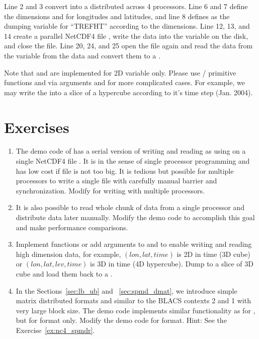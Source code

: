 Line 2 and 3 convert  into a  distributed
across 4 processors. Line 6 and 7 define the dimensions
 and  for longitudes and latitudes, and line 8
defines  as the dumping variable for ``TREFHT'' according
to the dimensions.
 Line 12, 13, and 14 create a parallel NetCDF4 file
,
write the data into the variable on the disk, and close the file.
Line 20, 24, and 25 open the file again and read the data from the
variable from the data and convert them to a .

Note that  and  are implemented
for 2D variable only. Please use / primitive functions
 and  via arguments 
and  for more complicated cases. For example, we may write
the  into a slice of a hypercube according to it's time step
(Jan. 2004).


\section{Exercises}
\label{sec:pbdNCDF4_exercise}

\begin{enumerate}[label=\thechapter-\arabic*]
\item
The demo code  of  has a serial version
of writing and reading  as using  on a single
NetCDF4 file . It is in the sense of single processor
programming and has low cost if file is not too big.
It is tedious but possible for multiple processors to write
a single file with carefully manual barrier and synchronization.
Modify  for writing with multiple processors.

\item
It is also possible to read whole chunk of data from a single processor
and distribute data later manually. Modify the demo code
 to accomplish this goal and make performance
comparisons.

\item
Implement functions or add arguments to  and
 to enable writing and reading high dimension data,
for example, $(lon, lat, time)$ is 2D in time (3D cube) or
$(lon, lat, lev, time)$ is 3D in time (4D hypercube).
Dump  to a slice of 3D cube and load them back to a
.

\item
In the Sections~\ref{sec:lb_ub} and ~\ref{sec:spmd_dmat}, we introduce
simple matrix distributed formats  and  similar to
the BLACS contexts  2 and 1 with very large block size.
The demo code
 implements similar functionality as for
, but for  format only. Modify the demo code for
 format.
{\color{blue}Hint: See the Exercise~\ref{ex:nc4_spmdr}.
}

\end{enumerate}

